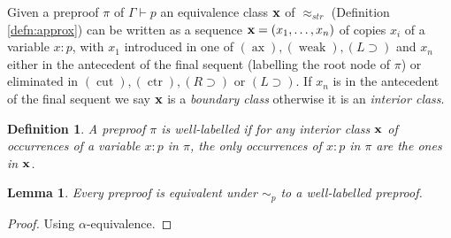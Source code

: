 \documentclass[english,letter paper,12pt,leqno]{article}
\newtheorem{lemma}[theorem]{Lemma}
\theoremstyle{example}
\newtheorem{definition}[theorem]{Definition}
\numberwithin{equation}{section}
\def\imp{\supset}
\begin{document}
Given a preproof $\pi$ of $\Gamma \vdash p$ an equivalence class $\bold{x}$ of $\approx_{str}$ (Definition \ref{defn:approx}) can be written as a sequence $\bold{x} = ( x_1, \ldots, x_n )$ of copies $x_i$ of a variable $x:p$, with $x_1$ introduced in one of $(\operatorname{ax}), (\operatorname{weak}), (L \imp)$ and $x_n$ either in the antecedent of the final sequent (labelling the root node of $\pi$) or eliminated in $(\operatorname{cut}), (\operatorname{ctr}), (R \imp)$ or $(L \imp)$. If $x_n$ is in the antecedent of the final sequent we say $\bold{x}$ is a \emph{boundary class} otherwise it is an \emph{interior class}.

\begin{definition} A preproof $\pi$ is \emph{well-labelled} if for any interior class $\bold{x}$ of occurrences of a variable $x:p$ in $\pi$, the only occurrences of $x:p$ in $\pi$ are the ones in $\bold{x}$.
\end{definition}


\begin{lemma}\label{lemma:all_well} Every preproof is equivalent under $\sim_p$ to a well-labelled preproof.
\end{lemma}
\begin{proof}
Using $\alpha$-equivalence.
\end{proof}
\end{document}
